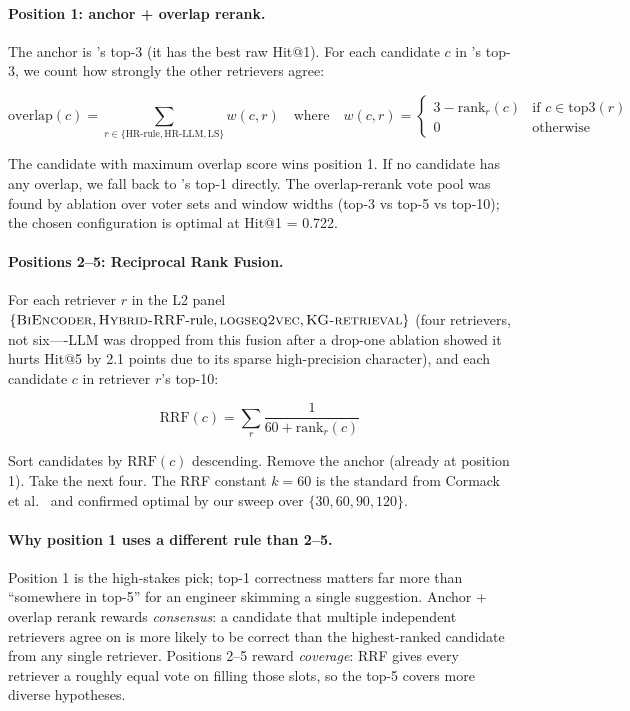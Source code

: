 \paragraph{Position 1: anchor + overlap rerank.}
The anchor is \bienc{}'s top-3 (it has the best raw Hit@1). For each candidate $c$ in \bienc{}'s top-3, we count how strongly the other retrievers agree:

\[
\mathrm{overlap}(c) = \sum_{r \in \{\text{HR-rule}, \text{HR-LLM}, \text{LS}\}} w(c, r)
\quad\text{where}\quad
w(c, r) = \begin{cases} 3 - \mathrm{rank}_r(c) & \text{if } c \in \mathrm{top3}(r) \\ 0 & \text{otherwise} \end{cases}
\]

The candidate with maximum overlap score wins position 1. If no candidate has any overlap, we fall back to \bienc{}'s top-1 directly. The overlap-rerank vote pool was found by ablation over voter sets and window widths (top-3 vs top-5 vs top-10); the chosen configuration is optimal at Hit@1 = 0.722.

\paragraph{Positions 2--5: Reciprocal Rank Fusion.}
For each retriever $r$ in the L2 panel $\{\textsc{BiEncoder}{}, \textsc{Hybrid-RRF}{}\text{-rule}, \textsc{logseq2vec}{}, \textsc{KG-retrieval}{}\}$ (four retrievers, not six---\hrrf{}-LLM was dropped from this fusion after a drop-one ablation showed it hurts Hit@5 by 2.1 points due to its sparse high-precision character), and each candidate $c$ in retriever $r$'s top-10:

\[
\mathrm{RRF}(c) = \sum_{r} \frac{1}{60 + \mathrm{rank}_r(c)}
\]

Sort candidates by $\mathrm{RRF}(c)$ descending. Remove the anchor (already at position 1). Take the next four. The RRF constant $k = 60$ is the standard from Cormack et al.~\cite{rrf} and confirmed optimal by our sweep over $\{30, 60, 90, 120\}$.

\paragraph{Why position 1 uses a different rule than 2--5.}
Position 1 is the high-stakes pick; top-1 correctness matters far more than ``somewhere in top-5'' for an engineer skimming a single suggestion. Anchor + overlap rerank rewards \emph{consensus}: a candidate that multiple independent retrievers agree on is more likely to be correct than the highest-ranked candidate from any single retriever. Positions 2--5 reward \emph{coverage}: RRF gives every retriever a roughly equal vote on filling those slots, so the top-5 covers more diverse hypotheses.

